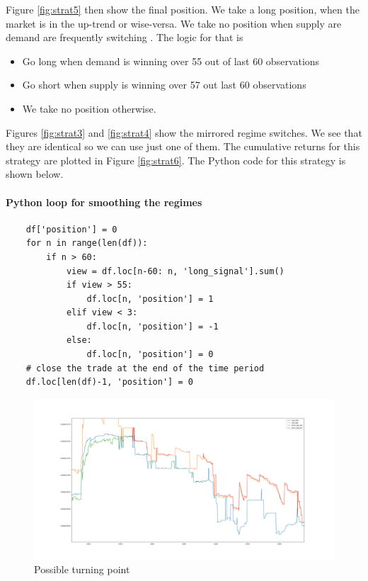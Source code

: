 \documentclass[12pt]{article}
\begin{document}
Figure \ref{fig:strat5} then show the final position. We take a long position, when the market is in the up-trend or wise-versa. We take no position when supply are demand are  frequently switching . The logic for that is

\begin{itemize}
\item Go long when demand is winning over 55 out of last 60 observations
\item Go short when supply is winning over 57  out last 60 observations
\item We take no position otherwise.
\end{itemize}
Figures \ref{fig:strat3} and \ref{fig:strat4} show the mirrored regime switches. We see that they are identical so we can use just one of them.
The cumulative returns for this strategy are plotted in Figure \ref{fig:strat6}. The Python code for this strategy is shown below.

\pagebreak
\paragraph*{Python loop for smoothing the regimes}
\begin{verbatim}
    df['position'] = 0
    for n in range(len(df)):
        if n > 60:
            view = df.loc[n-60: n, 'long_signal'].sum()
            if view > 55:
                df.loc[n, 'position'] = 1
            elif view < 3:
                df.loc[n, 'position'] = -1
            else:
                df.loc[n, 'position'] = 0
    # close the trade at the end of the time period
    df.loc[len(df)-1, 'position'] = 0
\end{verbatim}
\FloatBarrier
\begin{figure}[h!]
	\centering
  \includegraphics[width=\textwidth]{strategy2.png}
  \caption{Possible turning point}
  \label{fig:strat2}
\end{figure}
\end{document}
